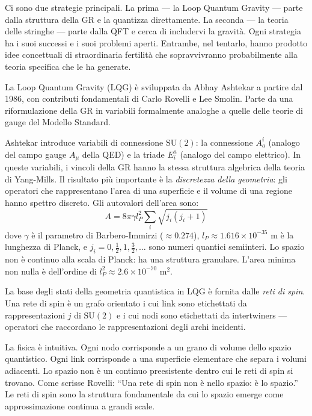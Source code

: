 \documentclass[12pt,a4paper,openany]{book}
\newcommand{\sezione}[1]{\vspace{1.2em}{\large\bfseries #1}\vspace{0.5em}\par}
\begin{document}
Ci sono due strategie principali. La prima — la Loop Quantum Gravity — parte dalla struttura della GR e la quantizza direttamente. La seconda — la teoria delle stringhe — parte dalla QFT e cerca di includervi la gravità. Ogni strategia ha i suoi successi e i suoi problemi aperti. Entrambe, nel tentarlo, hanno prodotto idee concettuali di straordinaria fertilità che sopravvivranno probabilmente alla teoria specifica che le ha generate.

\sezione{Loop Quantum Gravity: le variabili di Ashtekar}

La Loop Quantum Gravity (LQG) è sviluppata da Abhay Ashtekar a partire dal 1986, con contributi fondamentali di Carlo Rovelli e Lee Smolin. Parte da una riformulazione della GR in variabili formalmente analoghe a quelle delle teorie di gauge del Modello Standard.

Ashtekar introduce variabili di connessione $\mathrm{SU}(2)$: la connessione $A_a^i$ (analogo del campo gauge $A_\mu$ della QED) e la triade $E_i^a$ (analogo del campo elettrico). In queste variabili, i vincoli della GR hanno la stessa struttura algebrica della teoria di Yang-Mills. Il risultato più importante è la \textit{discretezza della geometria}: gli operatori che rappresentano l'area di una superficie e il volume di una regione hanno spettro discreto. Gli autovalori dell'area sono:
\[
A = 8\pi\gamma l_P^2 \sum_i \sqrt{j_i(j_i+1)}
\]
dove $\gamma$ è il parametro di Barbero-Immirzi ($\approx 0.274$), $l_P \approx 1.616 \times 10^{-35}$ m è la lunghezza di Planck, e $j_i = 0, \tfrac{1}{2}, 1, \tfrac{3}{2}, \ldots$ sono numeri quantici semiinteri. Lo spazio non è continuo alla scala di Planck: ha una struttura granulare. L'area minima non nulla è dell'ordine di $l_P^2 \approx 2.6 \times 10^{-70}$ m$^2$.

\sezione{Le reti di spin: lo spazio come grafo quantistico}

La base degli stati della geometria quantistica in LQG è fornita dalle \textit{reti di spin}. Una rete di spin è un grafo orientato i cui link sono etichettati da rappresentazioni $j$ di $\mathrm{SU}(2)$ e i cui nodi sono etichettati da intertwiners — operatori che raccordano le rappresentazioni degli archi incidenti.

La fisica è intuitiva. Ogni nodo corrisponde a un grano di volume dello spazio quantistico. Ogni link corrisponde a una superficie elementare che separa i volumi adiacenti. Lo spazio non è un continuo preesistente dentro cui le reti di spin si trovano. Come scrisse Rovelli: ``Una rete di spin non è nello spazio: è lo spazio.'' Le reti di spin sono la struttura fondamentale da cui lo spazio emerge come approssimazione continua a grandi scale.
\end{document}
